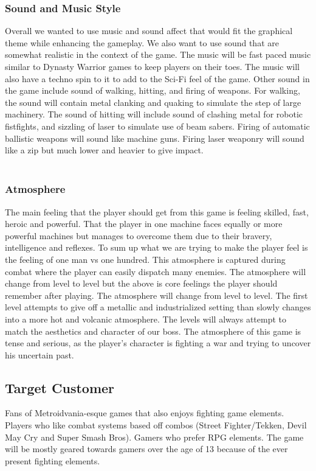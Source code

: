 \documentclass{article}
\begin{document}
    \subsubsection*{Sound and Music Style}
    Overall we wanted to use music and sound affect that would fit the graphical theme while enhancing the gameplay. We also want to use sound that are somewhat realistic in the context of the game. The music will be fast paced music similar to Dynasty Warrior games to keep players on their toes. The music will also have a techno spin to it to add to the Sci-Fi feel of the game. Other sound in the game include sound of walking, hitting, and firing of weapons. For walking, the sound will contain metal clanking and quaking to simulate the step of large machinery. The sound of hitting will include sound of clashing metal for robotic fistfights, and sizzling of laser to simulate use of beam sabers. Firing of automatic ballistic weapons will sound like machine guns. Firing laser weaponry will sound like a zip but much lower and heavier to give impact.\\\\
    \subsubsection*{Atmosphere}
    The main feeling that the player should get from this game is feeling skilled, fast, heroic and powerful. That the player in one machine faces equally or more powerful machines but manages to overcome them due to their bravery, intelligence and reflexes. To sum up what we are trying to make the player feel is the feeling of one man vs one hundred. This atmosphere is captured during combat where the player can easily dispatch many enemies. The atmosphere will change from level to level but the above is core feelings the player  should remember after playing. The atmosphere will change from level to level. The first level attempts to give off a metallic and industrialized setting than slowly changes into a more hot and volcanic atmosphere. The levels will always attempt to match the aesthetics and character of our boss. The atmosphere of this game is tense and serious, as the player's character is fighting a war and trying to uncover his uncertain past.

\subsection*{Target Customer}
Fans of Metroidvania-esque games that also enjoys fighting game elements. Players who like combat systems based off combos (Street Fighter/Tekken, Devil May Cry and Super Smash Bros).
Gamers who prefer RPG elements. The game will be mostly geared towards gamers over the age of 13 because of the ever present fighting elements. 
\end{document}
